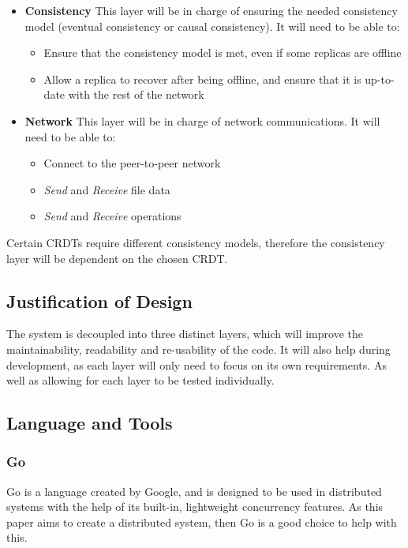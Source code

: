 \documentclass[12pt]{article}
\begin{document}
\begin{itemize}
    \item \textbf{Consistency} This layer will be in charge of ensuring the needed consistency model (eventual consistency or causal consistency). It will need to be able to:
        \begin{itemize}
            \item Ensure that the consistency model is met, even if some replicas are offline
            \item Allow a replica to recover after being offline, and ensure that it is up-to-date with the rest of the network
        \end{itemize}
    \item \textbf{Network} This layer will be in charge of network communications. It will need to be able to:
        \begin{itemize}
            \item Connect to the peer-to-peer network
            \item \textit{Send} and \textit{Receive} file data
            \item \textit{Send} and \textit{Receive} operations
        \end{itemize}
\end{itemize}
Certain CRDTs require different consistency models, therefore the consistency layer will be dependent on the chosen CRDT. \par

\subsection{Justification of Design}
The system is decoupled into three distinct layers, which will improve the maintainability, readability and re-usability of the code. It will also help during development, as each layer will only need to focus on its own requirements. As well as allowing for each layer to be tested individually. \par

\subsection{Language and Tools}
\subsubsection{Go}
Go is a language created by Google, and is designed to be used in distributed systems with the help of its built-in, lightweight concurrency features. As this paper aims to create a distributed system, then Go is a good choice to help with this. \par
\end{document}
